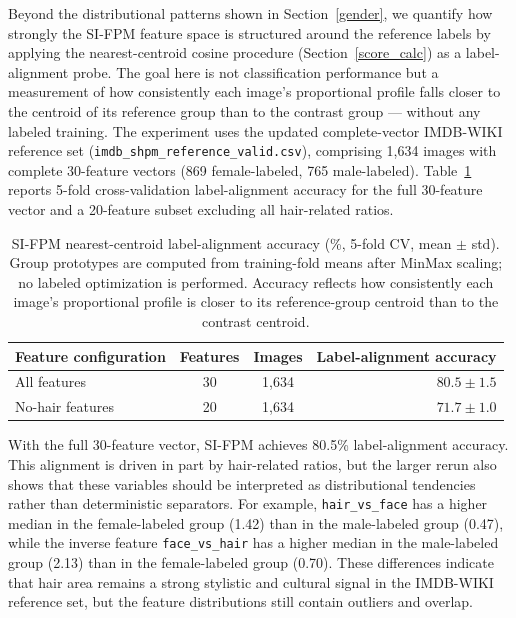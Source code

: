 \documentclass{article}
\begin{document}
Beyond the distributional patterns shown in Section~\ref{gender}, we quantify how strongly the SI-FPM feature space is structured around the reference labels by applying the nearest-centroid cosine procedure (Section~\ref{score_calc}) as a label-alignment probe. The goal here is not classification performance but a measurement of how consistently each image's proportional profile falls closer to the centroid of its reference group than to the contrast group — without any labeled training. The experiment uses the updated complete-vector IMDB-WIKI reference set (\texttt{imdb\_shpm\_reference\_valid.csv}), comprising 1,634 images with complete 30-feature vectors (869 female-labeled, 765 male-labeled). Table~\ref{tab:classification} reports 5-fold cross-validation label-alignment accuracy for the full 30-feature vector and a 20-feature subset excluding all hair-related ratios.

\begin{table}[ht]
\centering
\caption{SI-FPM nearest-centroid label-alignment accuracy (\%, 5-fold CV, mean $\pm$ std). Group prototypes are computed from training-fold means after MinMax scaling; no labeled optimization is performed. Accuracy reflects how consistently each image's proportional profile is closer to its reference-group centroid than to the contrast centroid.}
\label{tab:classification}
\small
\begin{tabular}{@{}lccr@{}}
\toprule
Feature configuration & Features & Images & Label-alignment accuracy \\
\midrule
All features       & 30 & 1,634 & $80.5 \pm 1.5$ \\
No-hair features   & 20 & 1,634 & $71.7 \pm 1.0$ \\
\bottomrule
\end{tabular}
\end{table}

With the full 30-feature vector, SI-FPM achieves 80.5\% label-alignment accuracy. This alignment is driven in part by hair-related ratios, but the larger rerun also shows that these variables should be interpreted as distributional tendencies rather than deterministic separators. For example, \texttt{hair\_vs\_face} has a higher median in the female-labeled group (1.42) than in the male-labeled group (0.47), while the inverse feature \texttt{face\_vs\_hair} has a higher median in the male-labeled group (2.13) than in the female-labeled group (0.70). These differences indicate that hair area remains a strong stylistic and cultural signal in the IMDB-WIKI reference set, but the feature distributions still contain outliers and overlap.
\end{document}

